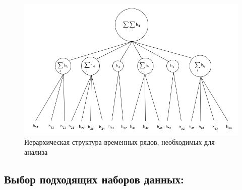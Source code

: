 \documentclass[c, dvipsnames]{beamer}  %
\begin{document}
\begin{frame}[shrink=5]
\frametitle{\insertsection} 
\framesubtitle{\insertsubsection}



\begin{figure}
	\centering
	\includegraphics[width=0.8\linewidth]{Screenshot51}
	\caption{Иерархическая структура временных рядов, необходимых для анализа}
	\label{fig:screenshot51}
\end{figure}



\end{frame}


%
%


\subsection{Выбор подходящих наборов данных:} 
\end{document}
